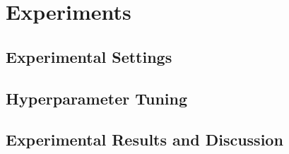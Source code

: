 \chapter{Experiments}

\section{Experimental Settings}

\section{Hyperparameter Tuning}

\section{Experimental Results and Discussion}

